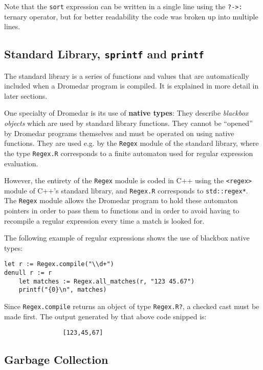 \documentclass{article}
\newcommand{\code}[1]{\lstinline[columns=fixed]{#1}}
\begin{document}
					Note that the \code{sort} expression can be written in a single line using the \code{?->:} ternary operator, but for better readability the code was broken up into multiple lines.
		
		\subsection{Standard Library, \code{sprintf} and \code{printf}}
		
			The standard library is a series of functions and values that are automatically included when a Dromedar program is compiled. It is explained in more detail in later sections.
			
			One specialty of Dromedar is its use of \textbf{native types}: They describe \textit{blackbox objects} which are used by standard library functions. They cannot be ``opened'' by Dromedar programs themselves and must be operated on using native functions. They are used e.g. by the \code{Regex} module of the standard library, where the type \code{Regex.R} corresponds to a finite automaton used for regular expression evaluation.
			
			However, the entirety of the \code{Regex} module is coded in C++ using the \texttt{<regex>} module of C++'s standard library, and \code{Regex.R} corresponds to \texttt{std::regex*}. The \code{Regex} module allows the Dromedar program to hold these automaton pointers in order to pass them to functions and in order to avoid having to recompile a regular expression every time a match is looked for.
			
			The following example of regular expressions shows the use of blackbox native types:
			
			\begin{lstlisting}
let r := Regex.compile("\\d+")
denull r := r
	let matches := Regex.all_matches(r, "123 45.67")
	printf("{0}\n", matches)
			\end{lstlisting}
			
			Since \code{Regex.compile} returns an object of type \code{Regex.R?}, a checked cast must be made first. The output generated by that above code snipped is:
			
			\begin{verbatim}
				[123,45,67]
			\end{verbatim}
		
		\subsection{Garbage Collection}
		
\end{document}
